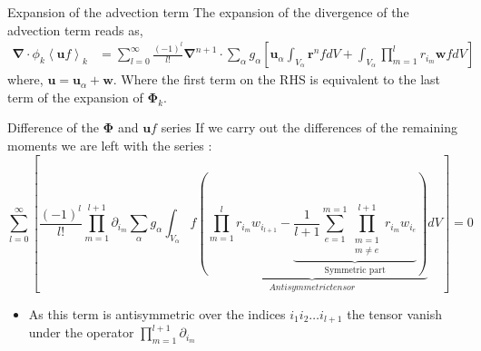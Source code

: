 \documentclass{sintefbeamer}
\newcommand{\kavg}[1]{\left<#1\right>_k}
\newcommand{\partialp}[2]{ \prod_{m=#1}^{#2} \partial_{i_m}}
\newcommand{\nablab}{\bm{\nabla}}
\begin{document}
\begin{frame}
  {Expansion of the advection term}
  The expansion of the divergence of the advection term reads as, 
  \begin{align*}
    \nablab \cdot \phi_k \kavg{\textbf{u} f}
    &= \sum_{l=0}^\infty  
    \frac{(-1)^l}{l!} 
    \nablab^{n+1} \cdot
    \sum_\alpha  g_\alpha 
    \left[
      \textbf{u}_\alpha  \int_{V_\alpha} \textbf{r}^{n} f dV
    + \int_{V_\alpha} \prod^l_{m=1}r_{i_m} \textbf{w} f dV
    \right]
    \label{ap:eq:partial_uf}
\end{align*}
where, $\textbf{u} = \textbf{u}_\alpha + \textbf{w}$.
Where the first term on the RHS is equivalent to the last term of the expansion of $\bm{\Phi}_k$.
\end{frame}

\begin{frame}
  {Difference of the $\bm{\Phi}$ and $\textbf{u}f$ series}
If we carry out the differences of the remaining moments we are left with the series :
\begin{equation*}    
  \sum_{l=0}^\infty  
  \left[
      \frac{(-1)^l}{l!} \prod^{l+1}_{m=1}\partial_{i_m}
      \sum_\alpha  g_\alpha 
      \int_{V_\alpha} f
      \underbrace{\left(
          \prod^l_{m=1}r_{i_m} w_{i_{l+1}} 
          -
          \underbrace{\frac{1}{l+1}
          \sum_{e=1}^{m=1} 
          \prod^{l+1}_{\substack{m=1\\ m\neq e}} 
          r_{i_m} 
          w_{i_e}}_{\text{Symmetric part}}
      \right)}_{Anti symmetric tensor}
      dV
  \right] = 0
  \label{ap:eq:diff_rw_term}
\end{equation*}  
\begin{itemize}
  \item As this term is antisymmetric over the indices $i_1i_2\ldots i_{l+1}$ the tensor vanish under the operator $\partialp{1}{l+1}$
\end{itemize}
\end{frame}
\end{document}
